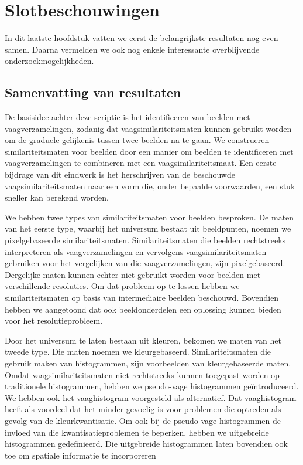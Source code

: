 \chapter{Slotbeschouwingen}

In dit laatste hoofdstuk vatten we eerst de belangrijkste resultaten
nog even samen. Daarna vermelden we ook nog enkele interessante overblijvende
onderzoekmogelijkheden.

\section{Samenvatting van resultaten}

De basisidee achter deze scriptie is het identificeren van beelden
met vaagverzamelingen, zodanig dat vaagsimilariteitsmaten kunnen gebruikt worden
om de graduele gelijkenis tussen twee beelden na te gaan. 
We construeren similariteitsmaten voor beelden door een manier om beelden te
identificeren met vaagverzamelingen te combineren met een vaagsimilariteitsmaat.
Een eerste bijdrage van dit eindwerk is het herschrijven van de beschouwde
vaagsimilariteitsmaten naar een vorm die, onder bepaalde voorwaarden, een stuk
sneller kan berekend worden. 

We hebben twee types van similariteitsmaten voor beelden besproken.
De maten van het eerste type, waarbij het universum bestaat uit beeldpunten, 
noemen we pixelgebaseerde similariteitsmaten. Similariteitsmaten die 
beelden rechtstreeks interpreteren als vaagverzamelingen en vervolgens 
vaagsimilariteitsmaten gebruiken voor het vergelijken van die vaagverzamelingen, 
zijn pixelgebaseerd. Dergelijke maten kunnen echter niet gebruikt worden voor 
beelden met verschillende resoluties. Om dat probleem op te lossen hebben we 
similariteitsmaten op basis van intermediaire beelden beschouwd. Bovendien 
hebben we aangetoond dat ook beeldonderdelen een oplossing kunnen bieden voor 
het resolutieprobleem. 

Door het universum te laten bestaan uit kleuren, bekomen we maten van het tweede
type. Die maten noemen we kleurgebaseerd. Similariteitsmaten
die gebruik maken van histogrammen, zijn voorbeelden van kleurgebaseerde 
maten. Omdat vaagsimilariteitsmaten niet rechtstreeks kunnen
toegepast worden op traditionele histogrammen, hebben we pseudo-vage histogrammen
ge\"introduceerd. We hebben ook het vaaghistogram voorgesteld als alternatief.
Dat vaaghistogram heeft als voordeel dat het minder gevoelig is voor
problemen die optreden als gevolg van de kleurkwantisatie. Om ook bij de pseudo-vage
histogrammen de invloed van die kwantisatieproblemen te beperken, hebben we 
uitgebreide histogrammen gedefinieerd. Die uitgebreide histogrammen laten bovendien
ook toe om spatiale informatie te incorporeren

